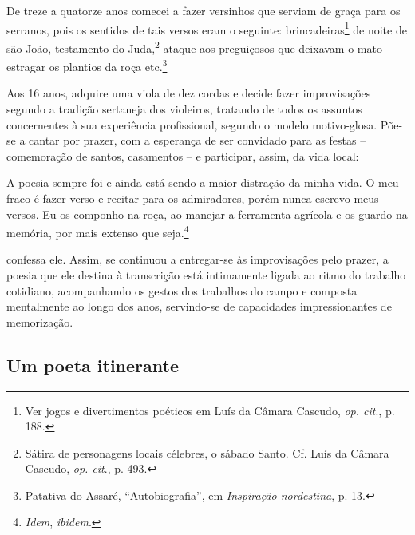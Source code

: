 \begin{hedraquote}
De treze a quatorze anos comecei a fazer
versinhos que serviam de graça para os serranos, pois os sentidos de tais versos
eram o seguinte: brincadeiras\footnote{ Ver jogos e divertimentos poéticos em
Luís da Câmara Cascudo,\textit{ op. cit}., p. 188.} de noite de são João,
testamento do Juda,\footnote{ Sátira de personagens locais célebres, o sábado
Santo. Cf. Luís da Câmara Cascudo, \textit{op. cit}., p. 493.} ataque aos
preguiçosos que deixavam o mato estragar os plantios da roça etc.\footnote{
Patativa do Assaré, “Autobiografia”, em \textit{Inspiração nordestina}, p. 13.}
\end{hedraquote}

\noindent Aos 16 anos, adquire uma viola de dez cordas e decide fazer improvisações
segundo a tradição sertaneja dos violeiros, tratando de todos os assuntos
concernentes à sua experiência profissional, segundo o modelo motivo-glosa.
Põe-se a cantar por prazer, com a esperança de ser convidado para as festas --
comemoração de santos, casamentos -- e participar, assim, da vida local: 

\begin{hedraquote}
A poesia sempre foi e ainda está sendo a maior distração da minha vida. O meu
fraco é fazer verso e recitar para os admiradores, porém nunca escrevo meus
versos. Eu os componho na roça, ao manejar a ferramenta agrícola e os guardo na
memória, por mais extenso que seja.\footnote{ \textit{Idem}, \textit{ibidem}.}
\end{hedraquote}

\noindent confessa ele.
Assim, se continuou a entregar-se às improvisações pelo prazer, a poesia que ele
destina à transcrição está intimamente ligada ao ritmo do trabalho cotidiano,
acompanhando os gestos dos trabalhos do campo e composta mentalmente ao longo
dos anos, servindo-se de capacidades impressionantes de memorização.

\subsection{Um poeta itinerante}

